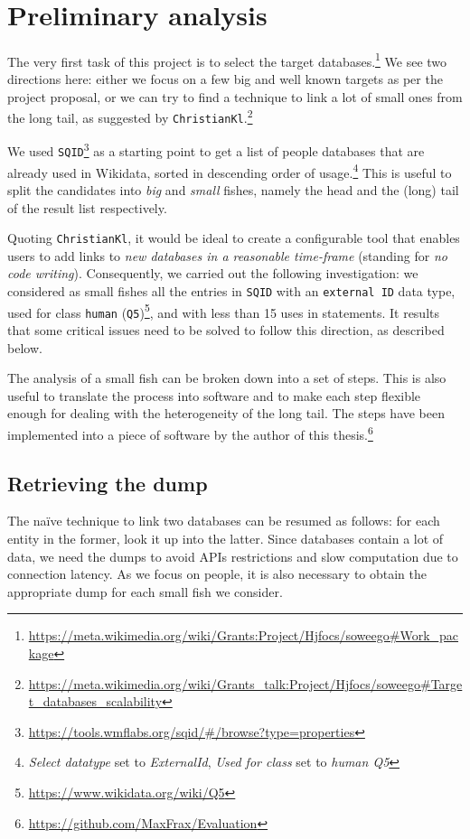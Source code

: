 \clearpage
\newpage
\mbox{~}
\clearpage
\newpage

\chapter{Preliminary analysis}
\label{cha:3}
The very first task of this project is to select the target databases.\footnote{\url{https://meta.wikimedia.org/wiki/Grants:Project/Hjfocs/soweego\#Work_package}} We see two directions here: either we focus on a few big and well known targets as per the project proposal, or we can try to find a technique to link a lot of small ones from the long tail, as suggested by \texttt{ChristianKl}.\footnote{\url{https://meta.wikimedia.org/wiki/Grants_talk:Project/Hjfocs/soweego\#Target_databases_scalability}}

We used \texttt{SQID}\footnote{\url{https://tools.wmflabs.org/sqid/\#/browse?type=properties}} as a starting point to get a list of people databases that are already used in Wikidata, sorted in descending order of usage.\footnote{\textit{Select datatype} set to \textit{ExternalId}, \textit{Used for class} set to \textit{human Q5}} This is useful to split the candidates into \textit{big} and \textit{small} fishes, namely the head and the (long) tail of the result list respectively.

Quoting \texttt{ChristianKl}, it would be ideal to create a configurable tool that enables users to add links to \textit{new databases in a reasonable time-frame} (standing for \textit{no code writing}). Consequently, we carried out the following investigation: we considered as small fishes all the entries in \texttt{SQID} with an \texttt{external ID} data type, used for class \texttt{human} (\texttt{Q5})\footnote{\url{https://www.wikidata.org/wiki/Q5}}, and with less than 15 uses in statements. It results that some critical issues need to be solved to follow this direction, as described below.

The analysis of a small fish can be broken down into a set of steps. This is also useful to translate the process into software and to make each step flexible enough for dealing with the heterogeneity of the long tail. The steps have been implemented into a piece of software by the author of this thesis.\footnote{\url{https://github.com/MaxFrax/Evaluation}}

\section{Retrieving the dump}
\label{cha:31}
The naïve technique to link two databases can be resumed as follows: for each entity in the former, look it up into the latter. Since databases contain a lot of data, we need the dumps to avoid APIs restrictions and slow computation due to connection latency.
As we focus on people, it is also necessary to obtain the appropriate dump for each small fish we consider.

